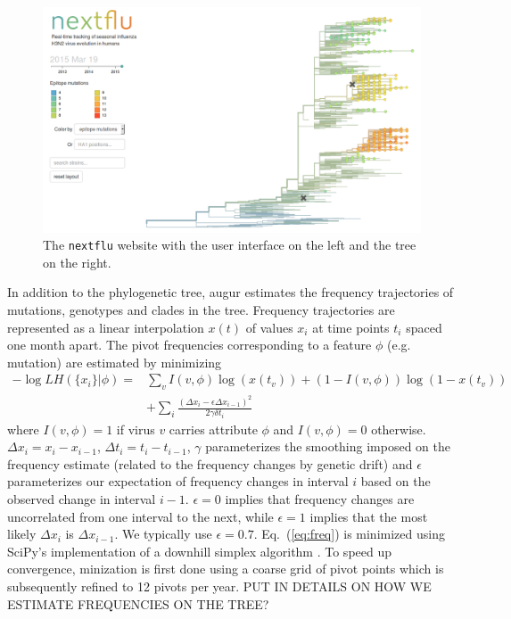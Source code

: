 \documentclass{bioinfo}
\newcommand{\EQ}[1]{Eq.~(\ref{eq:#1})}
\begin{document}
\begin{figure}[t!]
	\begin{center}
	\includegraphics[width=0.99\columnwidth]{figures/tree_screenshot}
\caption[]{The \texttt{nextflu} website with the user interface on the left and
the tree on the right.}
\label{fig:tree}
\end{center}
\end{figure}


In addition to the phylogenetic tree, augur estimates the frequency
trajectories of mutations, genotypes and clades in the tree. Frequency
trajectories are  represented as a linear interpolation $x(t)$ of values $x_i$
at time points  $t_i$ spaced one month apart. The pivot frequencies
corresponding to a feature $\phi$ (e.g. mutation) are estimated by minimizing
\begin{equation}
\label{eq:freq}
	\begin{split}
	-\log LH(\{x_i\} | \phi)  =& \sum_v I(v,\phi)\log(x(t_v)) + (1-I(v,\phi))\log(1-x(t_v)) \\
			&+\sum_i \frac{(\Delta x_i - \epsilon\Delta x_{i-1})^2}{2\gamma \delta t_i}
\end{split}
\end{equation}
where $I(v,\phi)=1$ if virus $v$ carries attribute $\phi$ and $I(v,\phi)=0$
otherwise. $\Delta x_i = x_i-x_{i-1}$, $\Delta t_i = t_i-t_{i-1}$, $\gamma$
parameterizes the smoothing imposed on the frequency estimate (related to the
frequency changes by genetic drift) and $\epsilon$ parameterizes our
expectation of frequency changes in interval $i$ based on the observed change
in interval $i-1$. $\epsilon=0$ implies that frequency changes are
uncorrelated from one interval to the next, while $\epsilon=1$ implies that
the most likely $\Delta x_i$ is $\Delta x_{i-1}$. We typically use $\epsilon =
0.7$. \EQ{freq} is minimized using SciPy's implementation of a downhill
simplex algorithm \citep{Oliphant:2007p25672}. To speed up convergence,
minization is first done using a coarse grid of pivot points which is
subsequently refined to 12 pivots per year. PUT IN DETAILS ON HOW WE ESTIMATE 
FREQUENCIES ON THE TREE?
\end{document}
